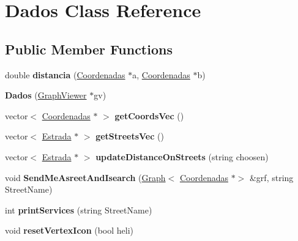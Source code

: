 \hypertarget{class_dados}{}\section{Dados Class Reference}
\label{class_dados}
\subsection*{Public Member Functions}
\begin{DoxyCompactItemize}
\item 
\hypertarget{class_dados_a36ab23feacc6b4c140daf063fd84a73b}{}\label{class_dados_a36ab23feacc6b4c140daf063fd84a73b} 
double {\bfseries distancia} (\hyperlink{class_coordenadas}{Coordenadas} $\ast$a, \hyperlink{class_coordenadas}{Coordenadas} $\ast$b)
\item 
\hypertarget{class_dados_aa55d11a27311aa33ea02115486c577d5}{}\label{class_dados_aa55d11a27311aa33ea02115486c577d5} 
{\bfseries Dados} (\hyperlink{class_graph_viewer}{Graph\+Viewer} $\ast$gv)
\item 
\hypertarget{class_dados_a6b639b659a4aceb2f47b3393bc286b56}{}\label{class_dados_a6b639b659a4aceb2f47b3393bc286b56} 
vector$<$ \hyperlink{class_coordenadas}{Coordenadas} $\ast$ $>$ {\bfseries get\+Coords\+Vec} ()
\item 
\hypertarget{class_dados_a84da44685f662f5e83c9d6579e105ab8}{}\label{class_dados_a84da44685f662f5e83c9d6579e105ab8} 
vector$<$ \hyperlink{class_estrada}{Estrada} $\ast$ $>$ {\bfseries get\+Streets\+Vec} ()
\item 
\hypertarget{class_dados_af54a3156f655a00b457ce6d24fd6216a}{}\label{class_dados_af54a3156f655a00b457ce6d24fd6216a} 
vector$<$ \hyperlink{class_estrada}{Estrada} $\ast$ $>$ {\bfseries update\+Distance\+On\+Streets} (string choosen)
\item 
\hypertarget{class_dados_a70cfcf24dd9263d7b1a11691544175c0}{}\label{class_dados_a70cfcf24dd9263d7b1a11691544175c0} 
void {\bfseries Send\+Me\+Asreet\+And\+Isearch} (\hyperlink{class_graph}{Graph}$<$ \hyperlink{class_coordenadas}{Coordenadas} $\ast$$>$ \&grf, string Street\+Name)
\item 
\hypertarget{class_dados_ac753c45f76ce054124318d1971ff5ce0}{}\label{class_dados_ac753c45f76ce054124318d1971ff5ce0} 
int {\bfseries print\+Services} (string Street\+Name)
\item 
\hypertarget{class_dados_ac90a691fabdbd9e49356b74bb3cdd1b9}{}\label{class_dados_ac90a691fabdbd9e49356b74bb3cdd1b9} 
void {\bfseries reset\+Vertex\+Icon} (bool heli)
$$
\end{DoxyCompactItemize}
